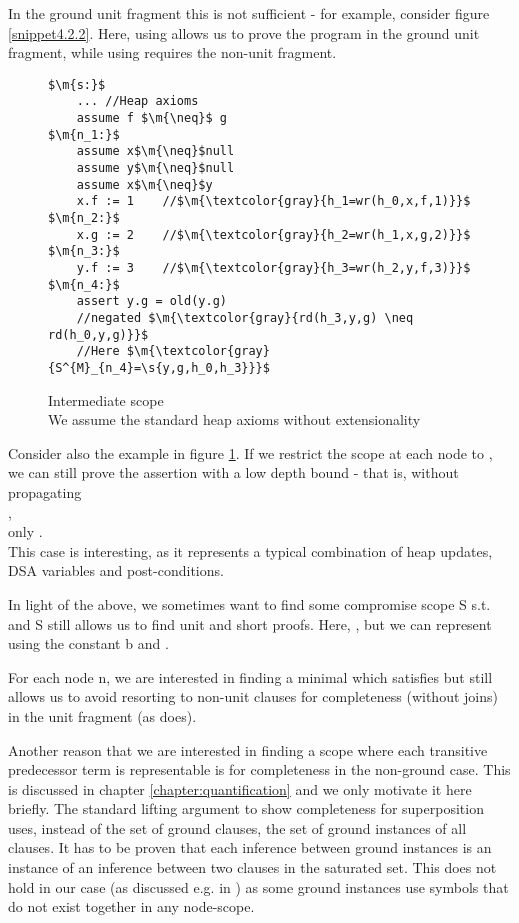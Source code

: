 In the ground unit fragment this is not sufficient - for example, consider figure \ref{snippet4.2.2}.
Here, using  allows us to prove the program in the ground unit fragment, 
while using  requires the non-unit fragment.

\begin{figure}
\begin{lstlisting}
$\m{s:}$
	... //Heap axioms
	assume f $\m{\neq}$ g
$\m{n_1:}$
	assume x$\m{\neq}$null
	assume y$\m{\neq}$null
	assume x$\m{\neq}$y
	x.f := 1    //$\m{\textcolor{gray}{h_1=wr(h_0,x,f,1)}}$
$\m{n_2:}$
	x.g := 2    //$\m{\textcolor{gray}{h_2=wr(h_1,x,g,2)}}$
$\m{n_3:}$
	y.f := 3    //$\m{\textcolor{gray}{h_3=wr(h_2,y,f,3)}}$
$\m{n_4:}$
	assert y.g = old(y.g) 
	//negated $\m{\textcolor{gray}{rd(h_3,y,g) \neq rd(h_0,y,g)}}$
	//Here $\m{\textcolor{gray}{S^{M}_{n_4}=\s{y,g,h_0,h_3}}}$
\end{lstlisting}
\caption{Intermediate scope\\
We assume the standard heap axioms without extensionality
}
\label{snippet4.2.4}
\end{figure}

Consider also the example in figure \ref{snippet4.2.4}.
If we restrict the scope at each node to , we can still prove the assertion with a low depth bound 
 - that is, without propagating \\
, \\
only .\\
This case is interesting, as it represents a typical combination of heap updates, DSA variables and post-conditions.

In light of the above, we sometimes want to find some compromise scope S s.t. 
 and S still allows us to find unit and short proofs.
Here, , but we can represent  using the constant b and .

For each node n, we are interested in finding a minimal  which satisfies  but still allows us to avoid resorting to non-unit clauses for completeness (without joins) in the unit fragment (as  does).

Another reason that we are interested in finding a scope where each transitive predecessor term is representable is for completeness in the non-ground case. This is discussed in chapter \ref{chapter:quantification} and we only motivate it here briefly.
The standard lifting argument to show completeness for superposition uses, instead of the set of ground clauses, the set of ground instances of all clauses. It has to be proven that each inference between ground instances is an instance of an inference between two clauses in the saturated set. This does not hold in our case (as discussed e.g. in \cite{BaumgartnerWaldmann13}) as some ground instances use symbols that do not exist together in any node-scope.

